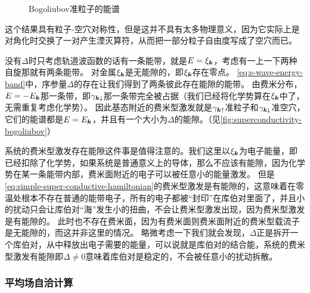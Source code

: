 \begin{figure}
    \centering
    \caption{Bogoliubov准粒子的能谱}
    \label{fig:superconductivity-bogoliubov}
\end{figure}

这个结果具有粒子-空穴对称性，但是这并不具有太多物理意义，因为它实际上是对角化时交换了一对产生湮灭算符，从而把一部分粒子自由度写成了空穴而已。

没有$\Delta$时只考虑轨道波函数的话有一条能带，就是$E = \xi_{\vb*{k}}$，考虑有一上一下两种自旋那就有两条能带。
对金属$\xi_{\vb*{k}}$是无能隙的，即$\xi_{\vb*{k}}$存在零点。%
\eqref{eq:s-wave-energy-band}中，序参量$\Delta$的存在让我们得到了两条彼此存在能隙的能带。
由费米分布，$E = - E_{\vb*{k}}$那一条带，即$\gamma_{\vb*{k} \downarrow}$那一条带完全被占据（我们已经将化学势算在$\xi_{\vb*{k}}$中了，无需重复考虑化学势）。
因此基态附近的费米型激发就是$\gamma_{\vb*{k} \uparrow}$准粒子和$\gamma_{\vb*{k} \downarrow}$准空穴，它们的能谱都是$E = E_{\vb*{k}}$，并且有一个大小为$\Delta$的能隙。（见\autoref{fig:superconductivity-bogoliubov}）

系统的费米型激发存在能隙这件事是值得注意的。我们这里以$\xi_{\vb*{k}}$为电子能量，即已经扣除了化学势，如果系统是普通意义上的导体，那么不应该有能隙，因为化学势在某一条能带内部，费米面附近的电子可以被任意小的能量激发。
但是\eqref{eq:simple-super-conductive-hamiltonian}的费米型激发是有能隙的，这意味着在零温处根本不存在普通的能带电子，所有的电子都被“封印”在库伯对里面了，并且小的扰动只会让库伯对“海”发生小的扭曲，不会让费米型激发出现，因为费米型激发是有能隙的。
此时也不存在费米面，因为有费米面则费米面附近的费米型载流子是无能隙的，而这并非这里的情况。
略微考虑一下我们就会发现，${\Delta}$正是拆开一个库伯对，从中释放出电子需要的能量，可以说就是库伯对的结合能，系统的费米型激发有能隙即$\Delta \neq 0$意味着库伯对是稳定的，不会被任意小的扰动拆散。


\subsubsection{平均场自洽计算}

